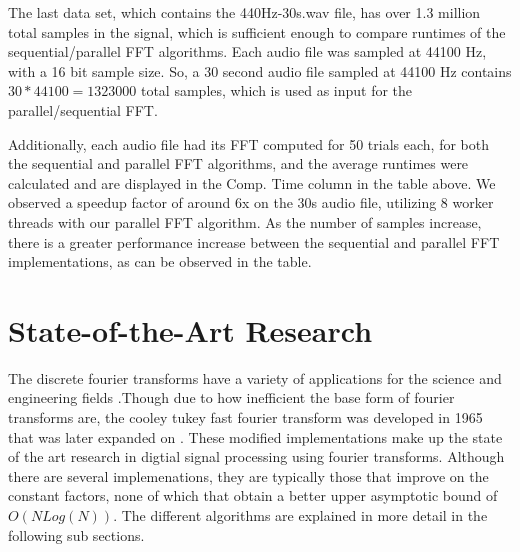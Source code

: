 \documentclass[journal]{IEEEtran}
\begin{document}
	\vspace{1em}
	\par{
		The last data set, which contains the 440Hz-30s.wav file, has over
		1.3 million total samples in the signal, which is sufficient enough
		to compare runtimes of the sequential/parallel FFT algorithms. Each
		audio file was sampled at 44100 Hz, with a 16 bit sample size. So, a 30
		second audio file sampled at 44100 Hz contains $30 * 44100 = 1323000$
		total samples, which is used as input for the parallel/sequential FFT.
	}
	\par{
		Additionally, each audio file had its FFT computed for 50 trials each, 
		for both the sequential and parallel FFT algorithms, and the 
		average runtimes were calculated and are displayed in the Comp. Time 
		column in the table above. We observed a speedup factor of 
		around 6x on the 30s audio file, utilizing 8 worker threads with our 
		parallel FFT algorithm. As the number of samples increase, 
		there is a greater performance increase between the sequential and 
		parallel FFT implementations, as can be observed in the table.
	}

\section{State-of-the-Art Research}

	\par {
		The discrete fourier transforms have a variety of applications for the 
		science and engineering fields \cite{Xiang}.Though due to how inefficient 
		the base form of fourier transforms are, the cooley tukey fast fourier transform 
		was developed in 1965 that was later expanded on \cite{CTA}. These modified implementations 
		make up the state of the art research in digtial signal processing using fourier transforms. 
		Although there are several implemenations, they are typically those that improve on the constant 
		factors, none of which that obtain a better upper asymptotic bound of ${O(N Log(N))}$. The different 
		algorithms are explained in more detail in the following sub sections.
	}
\end{document}
